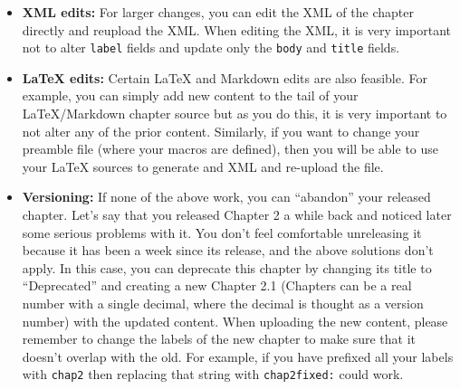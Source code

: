 \begin{gram}
\begin{itemize}
\item \textbf{XML edits:}
%
For larger changes, you can edit the XML of the chapter directly and
reupload the XML.  When editing the XML, it is very important not to
alter \lstinline`label` fields and update only the \lstinline`body` and \lstinline`title` fields.

\item \textbf{LaTeX edits:}
Certain LaTeX and Markdown edits are also feasible. 
%
For example, you can simply add new content to the tail of your LaTeX/Markdown chapter source but as you do this, it is very important to not alter any of the prior content. 
%
Similarly, if you want to change your preamble file (where your macros are defined), then you will be able to use your LaTeX sources to generate and XML and re-upload the file. 

\item \textbf{Versioning:} If none of the above work, you can ``abandon'' your released chapter.  Let's say that you released Chapter 2 a while back and noticed later some serious problems with it. You don't feel comfortable unreleasing it because it has been a week since its release, and the above solutions don't apply.  In this case, you can deprecate this chapter by changing its title to ``Deprecated'' and creating a new Chapter 2.1 (Chapters can be a real number with a single decimal, where the decimal is thought as a version number) with the updated content.  When uploading the new content, please remember to change the labels of the new chapter to make sure that it doesn't overlap with the old.  For example, if you have prefixed all your labels with 
%
\lstinline`chap2`
%
then replacing that string with 
%
\lstinline`chap2fixed:` 
%
could work.
\end{itemize}
\end{gram}

